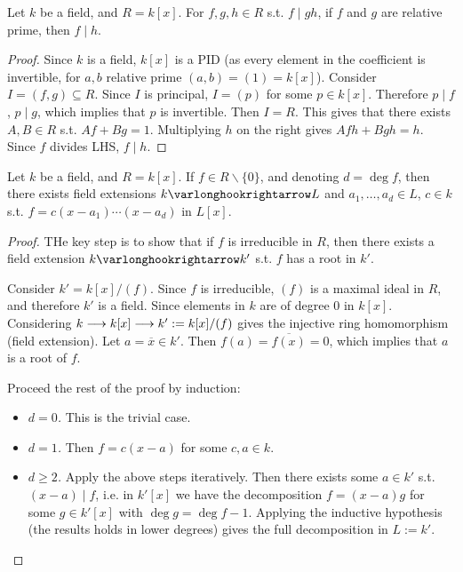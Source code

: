 \documentclass{article}
\begin{document}
\begin{proposition}\label{prop: divisibility for relative prime polynomials}
    Let $k$ be a field, and $R = k[x]$. For $f, g, h \in R$ s.t. $f \mid gh$, if $f$ and $g$ are relative prime, then $f \mid h$.
\end{proposition}

\begin{proof}
    Since $k$ is a field, $k[x]$ is a PID (as every element in the coefficient is invertible, for $a, b$ relative prime $(a, b) = (1) = k[x]$). Consider $I = (f, g) \subseteq R$. Since $I$ is principal, $I = (p)$ for some $p \in k[x]$. Therefore $p \mid f$, $p \mid g$, which implies that $p$ is invertible. Then $I = R$. This gives that there exists $A, B \in R$ s.t. $Af + Bg = 1$. Multiplying $h$ on the right gives $Afh + Bgh = h$. Since $f$ divides LHS, $f \mid h$.
\end{proof}

\begin{proposition}
    Let $k$ be a field, and $R = k[x]$. If $f \in R \smallsetminus \{0\}$, and denoting $d = \deg f$, then there exists field extensions $k \ext L$ and $a_1, \dots, a_d \in L$, $c \in k$ s.t. $f = c(x - a_1)\cdots (x - a_d)$ in $L[x]$.
\end{proposition}

\begin{proof}
    THe key step is to show that if $f$ is irreducible in $R$, then there exists a field extension $k \ext k'$ s.t. $f$ has a root in $k'$.

    Consider $k' = k[x]/(f)$. Since $f$ is irreducible, $(f)$ is a maximal ideal in $R$, and therefore $k'$ is a field. Since elements in $k$ are of degree 0 in $k[x]$. Considering $k \longrightarrow k[x] \longrightarrow k' := k[x]/(f)$ gives the injective ring homomorphism (field extension). Let $a = \overline{x} \in k'$. Then $f(a) = \overline{f(x)} = 0$, which implies that $a$ is a root of $f$.

    Proceed the rest of the proof by induction: 
    \begin{itemize}
        \item \emph{$d = 0$.} This is the trivial case.
        \item \emph{$d = 1$.} Then $f = c(x - a)$ for some $c, a \in k$.
        \item \emph{$d \geq 2$.} Apply the above steps iteratively. Then there exists some $a \in k'$ s.t. $(x - a) \mid f$, i.e. in $k'[x]$ we have the decomposition $f = (x - a) g$ for some $g \in k'[x]$ with $\deg g = \deg f - 1$. Applying the inductive hypothesis (the results holds in lower degrees) gives the full decomposition in $L := k'$. 
    \end{itemize}
\end{proof}
\end{document}

